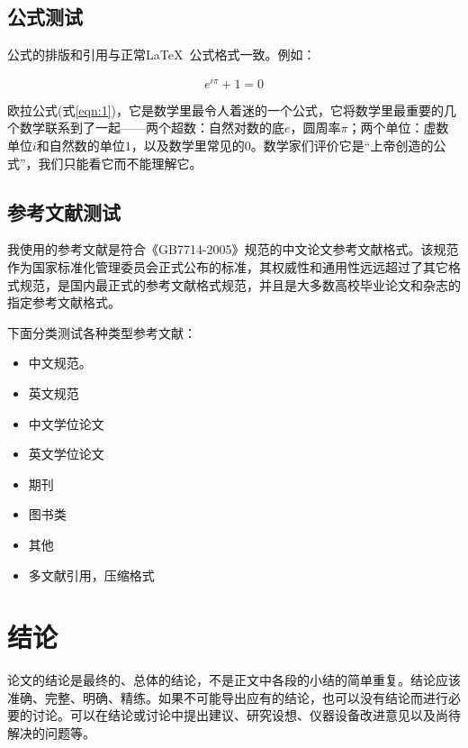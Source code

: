 \documentclass{bjtuthesis}
\begin{document}
\section{公式测试}
公式的排版和引用与正常\LaTeX\ 公式格式一致。例如：

\begin{equation}
    \label{eqn:1}
    e^{i\pi}+1=0
\end{equation}

欧拉公式(式\ref{eqn:1})，它是数学里最令人着迷的一个公式，它将数学里最重要的几个数学联系到了一起——两个超数：自然对数的底$e$，圆周率$\pi$；两个单位：虚数单位$i$和自然数的单位$1$，以及数学里常见的$0$。数学家们评价它是“上帝创造的公式”，我们只能看它而不能理解它。

\section{参考文献测试}
我使用的参考文献是符合《GB7714-2005》规范的中文论文参考文献格式。该规范作为国家标准化管理委员会正式公布的标准，其权威性和通用性远远超过了其它格式规范，是国内最正式的参考文献格式规范，并且是大多数高校毕业论文和杂志的指定参考文献格式。

下面分类测试各种类型参考文献：

\begin{itemize}
    \item 中文规范\citep{C1}。
    \item 英文规范\citep{ACI318}
    \item 中文学位论文\citep{liguiqian}
    \item 英文学位论文\citep{bentz2000}
    \item 期刊\citep{FMK}
    \item 图书类\citep{B1}
    \item 其他\citep{R1}
    \item 多文献引用，压缩格式\citep{C1,ACI318,liguiqian,R1}
\end{itemize}

\chapter{结论}
论文的结论是最终的、总体的结论，不是正文中各段的小结的简单重复。结论应该准确、完整、明确、精练。如果不可能导出应有的结论，也可以没有结论而进行必要的讨论。可以在结论或讨论中提出建议、研究设想、仪器设备改进意见以及尚待解决的问题等。
\end{document}
